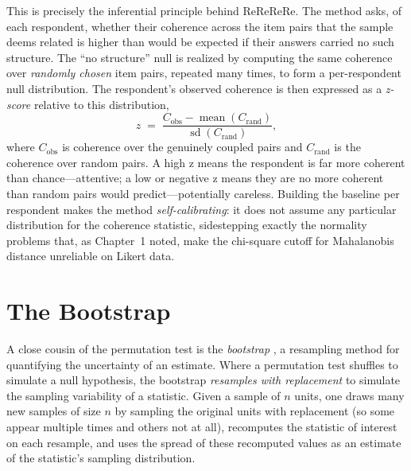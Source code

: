 \documentclass[doc,11pt,donotrepeattitle]{apa7}
\begin{document}
This is precisely the inferential principle behind ReReReRe. The method asks, of
each respondent, whether their coherence across the item pairs that the sample
deems related is higher than would be expected if their answers carried no such
structure. The ``no structure'' null is realized by computing the same coherence
over \emph{randomly chosen} item pairs, repeated many times, to form a
per-respondent null distribution. The respondent's observed coherence is then
expressed as a \emph{z-score} relative to this distribution,
\begin{equation}
z \;=\; \frac{C_{\text{obs}} - \operatorname{mean}(C_{\text{rand}})}
{\operatorname{sd}(C_{\text{rand}})},
\label{eq:z}
\end{equation}
where $C_{\text{obs}}$ is coherence over the genuinely coupled pairs and
$C_{\text{rand}}$ is the coherence over random pairs. A high z means the
respondent is far more coherent than chance---attentive; a low or negative z
means they are no more coherent than random pairs would predict---potentially
careless. Building the baseline per respondent makes the method
\emph{self-calibrating}: it does not assume any particular distribution for the
coherence statistic, sidestepping exactly the normality problems that, as
Chapter~1 noted, make the chi-square cutoff for Mahalanobis distance unreliable
on Likert data.

\section{The Bootstrap}
\label{sec:boot}

A close cousin of the permutation test is the \emph{bootstrap}
\parencite{efron1979bootstrap, efron1993introduction}, a resampling method for
quantifying the uncertainty of an estimate. Where a permutation test shuffles to
simulate a null hypothesis, the bootstrap \emph{resamples with replacement} to
simulate the sampling variability of a statistic. Given a sample of $n$ units,
one draws many new samples of size $n$ by sampling the original units with
replacement (so some appear multiple times and others not at all), recomputes
the statistic of interest on each resample, and uses the spread of these
recomputed values as an estimate of the statistic's sampling distribution.
\end{document}
